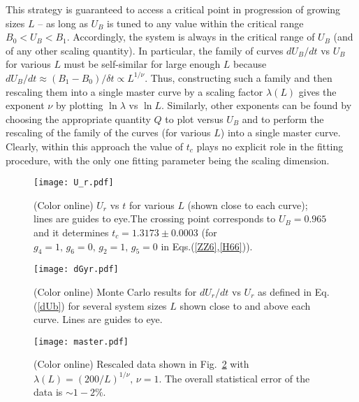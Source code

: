 \documentclass[prb,aps,twocolumn,groupedaddress,floats,showpacs,final]{revtex4}
\begin{document}
This strategy is guaranteed to access a critical point in progression of growing sizes $L$ -- as long as $U_B$ is tuned to any value within the critical range $B_0< U_B<B_1$. Accordingly, the system is always in the critical range of $U_B$ (and of any other scaling quantity). In particular, the family of curves $ dU_B/dt$ vs $U_B$ for various $L$ must be self-similar for large enough $L$ because
$dU_B/dt \approx (B_1-B_0)/\delta t \propto L^{1/\nu}$.   Thus, constructing such a family and then rescaling them into a single master curve by a scaling factor $\lambda(L)$ gives the exponent $\nu$ by plotting $\ln \lambda $ vs $\ln L$. Similarly, other exponents can be found by choosing the appropriate quantity $Q$ to plot versus $U_B$ and to perform the rescaling of the family of the curves (for various $L$) into a single master curve. Clearly, within this approach the value of $t_c$ plays no explicit role in the fitting procedure, with the only one fitting parameter being the scaling dimension.
\begin{figure}
\vspace*{-0.5cm}
 \texttt{[image: U\_r.pdf]}
\vskip-8mm
\caption{(Color online) $U_r$ vs $t$ for various $L$ (shown close to each curve); lines are guides to eye.The crossing point corresponds to $U_B=0.965$ and   it determines $t_c =1.3173 \pm 0.0003$ (for $g_4=1,\,g_6=0,\, g_2=1, \, g_5=0$ in Eqs.(\ref{ZZ6},\ref{H66})).}
\label{fig:cross}
\end{figure}
\begin{figure}
\vspace*{-0.5cm}
 \texttt{[image: dGyr.pdf]}
\vskip-8mm
\caption{(Color online) Monte Carlo results for $dU_r/dt$ vs  $U_r$ as defined in Eq.(\ref{dUb}) for several system sizes $L$ shown close to and above each curve. Lines are guides to eye.}
\label{fig:dUB}
\vskip-5mm
\end{figure}
\begin{figure}
\vspace*{-0.5cm}
 \texttt{[image: master.pdf]}
\vskip-8mm
\caption{(Color online) Rescaled data shown in Fig.~\ref{fig:dUB} with $\lambda(L)=(200/L)^{1/\nu},\, \nu=1$. The overall statistical error of the data is $\sim 1-2\%$.}
\label{fig:master}
\vskip-5mm
\end{figure}
\end{document}
